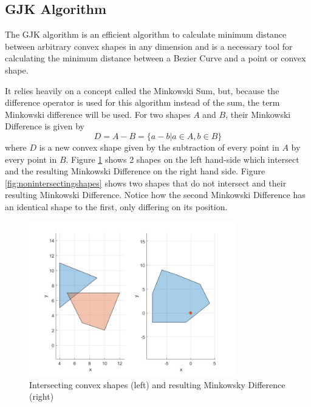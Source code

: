 \subsection{GJK Algorithm}
\label{sec:gjkalg}

\par The \ac{GJK} algorithm \cite{gilbert1988fast} is an efficient algorithm to calculate minimum distance between arbitrary convex shapes in any dimension and is a necessary tool for calculating the minimum distance between a Bezier Curve and a point or convex shape.
\par It relies heavily on a concept called the Minkowski Sum, but, because the difference operator is used for this algorithm instead of the sum, the term Minkowski difference will be used. For two shapes $A$ and $B$, their Minkowski Difference is given by
\begin{equation}
    D = A - B = \{a-b|a\in A, b\in B\}
\end{equation}
where $D$ is a new convex shape given by the subtraction of every point in $A$ by every point in $B$.
Figure \ref{fig:intersectingshapes} shows 2 shapes on the left hand-side which intersect and the resulting Minkowski Difference on the right hand side. Figure \ref{fig:nonintersectingshapes} shows two shapes that do not intersect and their resulting Minkowski Difference. Notice how the second Minkowski Difference has an identical shape to the first, only differing on its position.
\begin{figure}
\centering
\includegraphics[width=0.8\textwidth]{Images/intersectingshapes.jpg}
\caption{Intersecting convex shapes (left) and resulting Minkowsky Difference (right)}
\label{fig:intersectingshapes}
\end{figure}
